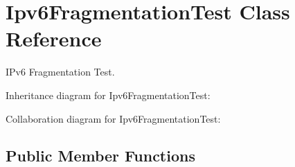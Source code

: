 \hypertarget{classIpv6FragmentationTest}{}\section{Ipv6\+Fragmentation\+Test Class Reference}
\label{classIpv6FragmentationTest}


I\+Pv6 Fragmentation Test.  




Inheritance diagram for Ipv6\+Fragmentation\+Test\+:


Collaboration diagram for Ipv6\+Fragmentation\+Test\+:
\subsection*{Public Member Functions}
